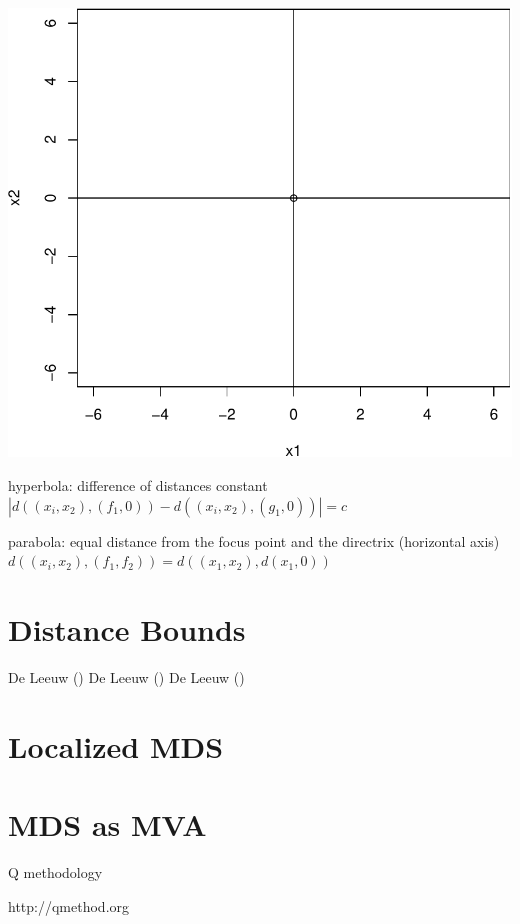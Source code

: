 \documentclass[
  12pt,
  letterpaper,
  DIV=11,
  numbers=noendperiod]{scrreprt}
\theoremstyle{remark}
\begin{document}
\begin{center}
\includegraphics{constrained_files/figure-pdf/plellip-1.pdf}
\end{center}

hyperbola: difference of distances constant
\(|d((x_i,x_2),(f_1,0))-d((x_i,x_2),(g_1,0))|=c\)

parabola: equal distance from the focus point and the directrix
(horizontal axis) \(d((x_i,x_2),(f_1,f_2))=d((x_1,x_2),d(x_1,0))\)

\section{Distance Bounds}\label{distance-bounds}

De Leeuw () De Leeuw
() De Leeuw
()

\section{Localized MDS}\label{localized-mds}

\section{MDS as MVA}\label{mds-as-mva}

Q methodology

http://qmethod.org
\end{document}
